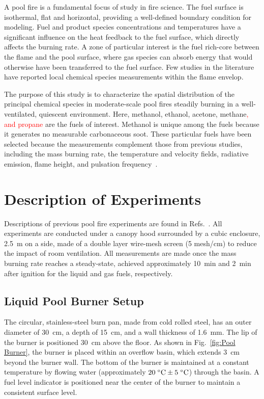 \documentclass[12pt]{article}
\begin{document}
A pool fire is a fundamental focus of study in fire science. The fuel surface is isothermal, flat and horizontal, providing a well-defined boundary condition for modeling. Fuel and product species concentrations and temperatures have a significant influence on the heat feedback to the fuel surface, which directly affects the burning rate. A zone of particular interest is the fuel rich-core between the flame and the pool surface, where gas species can absorb energy that would otherwise have been transferred to the fuel surface. Few studies in the literature have reported local chemical species measurements within the flame envelop.

The purpose of this study is to characterize the spatial distribution of the principal chemical species in moderate-scale pool fires steadily burning in a well-ventilated, quiescent environment. Here, methanol, ethanol, acetone, methane\textcolor{red}{, and propane} are the fuels of interest. Methanol is unique among the fuels because it generates no measurable carbonaceous soot. These particular fuels have been selected because the measurements complement those from previous studies, including the mass burning rate, the temperature and velocity fields, radiative emission, flame height, and pulsation frequency~\cite{Fisher1987,Hamins2016}.


\clearpage

\section{Description of Experiments}
\label{sec:Experiments}

Descriptions of previous pool fire experiments are found in Refs.~\cite{Hamins2016,Hamins1994,Hamins1991,Hamins1996,Lock2008}. All experiments are conducted under a canopy hood surrounded by a cubic enclosure, 2.5~m on a side, made of a double layer wire-mesh screen (5 mesh/cm) to reduce the impact of room ventilation. All measurements are made once the mass burning rate reaches a steady-state, achieved approximately 10~min and 2~min after ignition for the liquid and gas fuels, respectively.

\subsection{Liquid Pool Burner Setup}
\label{ssec:Liquid_Pool_Burner_Setup}

The circular, stainless-steel burn pan, made from cold rolled steel, has an outer diameter of 30~cm, a depth of 15~cm, and a wall thickness of 1.6~mm. The lip of the burner is positioned 30~cm above the floor. As shown in Fig.~\ref{fig:Pool Burner}, the burner is placed within an overflow basin, which extends 3~cm beyond the burner wall.  The bottom of the burner is maintained at a constant temperature by flowing water (approximately $20 \; ^\circ \hbox{C} \pm 5 \; ^\circ \hbox{C}$) through the basin. A fuel level indicator is positioned near the center of the burner to maintain a consistent surface level.
\end{document}
